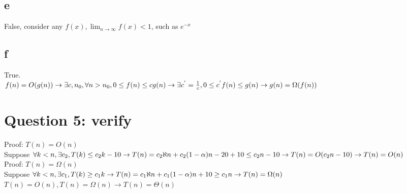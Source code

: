 \documentclass[]{article}
\begin{document}
\subsection{e}
False, consider any $f(x), \lim_{n \rightarrow \infty} f(x) < 1$, such as $e^{-x}$

\subsection{f}
True.\\
$
f(n) = O(g(n)) \rightarrow \exists c, n_{0}, \forall n > n_{0}, 0 \le f(n) \le cg(n)\\
\rightarrow \exists c^{'} = \frac{1}{c}, 0 \le c^{'}f(n) \le g(n)\\
\rightarrow g(n) = \Omega (f(n))
$
\section{Question 5: verify}
Proof: $ T(n) = O(n)$ \\
Suppose $\forall k<n, \exists c_{2}, T(k) \le c_{2}k - 10\\
\rightarrow T(n) = c_{2}\aleph n + c_{2}(1-\alpha) n - 20 + 10 \le c_{2}n - 10\\
\rightarrow T(n) = O(c_{2}n-10)\\
\rightarrow T(n) = O(n)\\$
\\
Proof: $ T(n) = \Omega(n)$ \\
Suppose $\forall k<n, \exists c_{1}, T(k) \ge c_{1}k\\
\rightarrow T(n) = c_{1}\aleph n + c_{1}(1-\alpha) n + 10 \ge c_{1}n\\
\rightarrow T(n) = \Omega(n)\\$
\\
$T(n) = O(n), T(n) = \Omega(n) \rightarrow T(n) = \Theta(n)$
\end{document}
